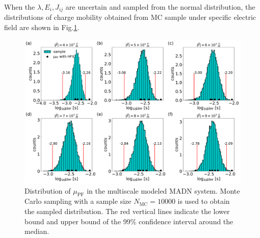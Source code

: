 \documentclass[letterpaper,12pt]{article}
\begin{document}
When the $\lambda, E_i, J_{ij}$ are uncertain and sampled from the normal distribution, the distributions of charge mobility obtained from MC sample under specific electric field are shown in Fig.\ref{fig:fig_mle_withE_mu2_ave}.
%
\begin{figure}[H]
    \centering
    \includegraphics[width=1.05\textwidth]{figs/fig_mle_withE_mu2_ave.pdf}
    \caption{Distribution of $\mu_\text{PF}$ in the multiscale modeled MADN system.
    Monte Carlo sampling with a sample size $N_\text{MC}=10000$ is used to obtain the sampled distribution. The red vertical lines indicate the lower bound and upper bound of the 99\% confidence interval around the median.}
    \label{fig:fig_mle_withE_mu2_ave}
\end{figure}
%
\end{document}
